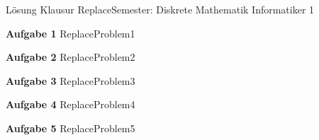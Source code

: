 \documentclass{article}
\begin{document}
\begin{center}
\huge{
Lösung Klausur ReplaceSemester: Diskrete Mathematik Informatiker 1} \\[2em]                                       \end{center}
\large


\vspace{1em}

{\bf Aufgabe 1 }
ReplaceProblem1

\vspace{3em}


{\bf Aufgabe 2 } 
ReplaceProblem2

\vspace{3em}


{\bf Aufgabe 3 } 
ReplaceProblem3

\vspace{3em}


{\bf Aufgabe 4 } 
ReplaceProblem4

\vspace{3em}


{\bf Aufgabe 5 } 
ReplaceProblem5
\end{document}
